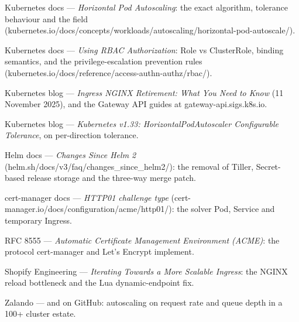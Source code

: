 \begin{iqbox}
\end{iqbox}

\begin{wbitem}
  \item Kubernetes docs --- \emph{Horizontal Pod Autoscaling}: the exact algorithm, tolerance behaviour and the  field (kubernetes.io/docs/concepts/workloads/autoscaling/horizontal-pod-autoscale/).
  \item Kubernetes docs --- \emph{Using RBAC Authorization}: Role vs ClusterRole, binding semantics, and the privilege-escalation prevention rules (kubernetes.io/docs/reference/access-authn-authz/rbac/).
  \item Kubernetes blog --- \emph{Ingress NGINX Retirement: What You Need to Know} (11 November 2025), and the Gateway API guides at gateway-api.sigs.k8s.io.
  \item Kubernetes blog --- \emph{Kubernetes v1.33: HorizontalPodAutoscaler Configurable Tolerance}, on per-direction tolerance.
  \item Helm docs --- \emph{Changes Since Helm 2} (helm.sh/docs/v3/faq/changes\_since\_helm2/): the removal of Tiller, Secret-based release storage and the three-way merge patch.
  \item cert-manager docs --- \emph{HTTP01 challenge type} (cert-manager.io/docs/configuration/acme/http01/): the solver Pod, Service and temporary Ingress.
  \item RFC 8555 --- \emph{Automatic Certificate Management Environment (ACME)}: the protocol cert-manager and Let's Encrypt implement.
  \item Shopify Engineering --- \emph{Iterating Towards a More Scalable Ingress}: the NGINX reload bottleneck and the Lua dynamic-endpoint fix.
  \item Zalando ---  and  on GitHub: autoscaling on request rate and queue depth in a 100+ cluster estate.
\end{wbitem}

